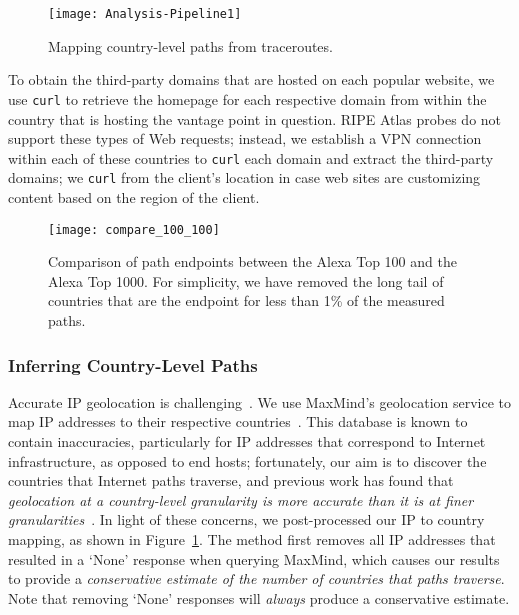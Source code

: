 \begin{figure}[t]
\centering
\texttt{[image: Analysis-Pipeline1]}
\caption{Mapping country-level paths from traceroutes.}
\label{fig:analysis_pipeline}
\end{figure}

To obtain the third-party domains that are hosted on each popular website, we
use {\tt curl} to retrieve the homepage for each respective domain from within
the country that is hosting the vantage point in question.  RIPE Atlas probes
do not support these types of Web requests; instead, we establish a VPN
connection within each of these countries to {\tt curl} each domain and
extract the third-party domains; we {\tt curl} from the client's location in
case web sites are customizing content based on the region of the client.

\begin{figure}[t]
\centering
\texttt{[image: compare\_100\_100]}
\caption{Comparison of path endpoints between the Alexa Top 100 and the Alexa Top 1000. For simplicity, we have 
removed the long tail of countries that are the endpoint for less than 1\% of the measured paths.}
\label{fig:compare_alexas}
\end{figure}

\subsubsection{Inferring Country-Level Paths}
\label{c_map}

Accurate IP geolocation is challenging~\cite{poese2011ip,katz2006towards,eriksson2010learning,gill2010dude,hu2012towards,guo2009mining,eriksson2012posit}. We use MaxMind's
geolocation service to map IP addresses to their respective
countries~\cite{maxmind}. This database is known to contain inaccuracies,
particularly for IP addresses that correspond to Internet infrastructure, as opposed
to end hosts; fortunately, our aim is to discover the countries that Internet paths
traverse, and previous work has found that
{\em geolocation at a country-level granularity is more accurate than it is at
finer granularities}~\cite{huffaker2011geocompare}.  
In light of these
concerns, we post-processed our IP to country mapping, as shown in Figure~\ref{fig:analysis_pipeline}.
The method first removes all IP addresses that resulted in a `None' response when
querying MaxMind, which causes our results to provide a {\em conservative
estimate of the number of countries that paths traverse}. 
Note that removing `None' responses will \textit{always} produce a
conservative estimate.

